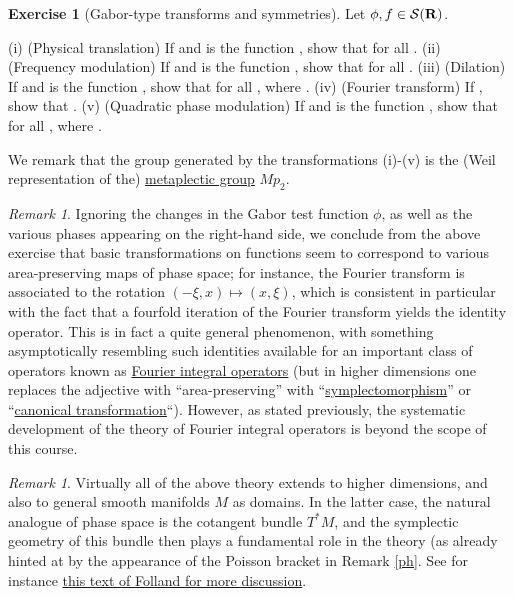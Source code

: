 \documentclass[11pt]{article}
\theoremstyle{definition}
\newtheorem{exercise}[theorem]{Exercise}
\theoremstyle{remark}
\newtheorem{remark}[theorem]{Remark}
\begin{document}
\begin{exercise}[Gabor-type transforms and symmetries]
  Let \({\phi, f \in {\mathcal S}({\bf R})}\). 


(i) (Physical translation) If  and  is the function , show that  for all . 
(ii) (Frequency modulation) If  and  is the function , show that  for all . 
(iii) (Dilation) If  and  is the function , show that  for all , where . 
(iv) (Fourier transform) If , show that . 
(v) (Quadratic phase modulation) If  and  is the function , show that  for all , where .


 We remark that the group generated by the transformations (i)-(v) is the (Weil representation of the) \href{https://en.wikipedia.org/wiki/Metaplectic_group}{metaplectic group} \({Mp_2}\). 

\end{exercise}
\begin{remark}
  Ignoring the changes in the Gabor test function \({\phi}\), as well as the various phases appearing on the right-hand side, we conclude from the above exercise that basic transformations on functions seem to correspond to various area-preserving maps of phase space; for instance, the Fourier transform is associated to the rotation \({(-\xi,x) \mapsto (x,\xi)}\), which is consistent in particular with the fact that a fourfold iteration of the Fourier transform yields the identity operator. This is in fact a quite general phenomenon, with something asymptotically resembling such identities available for an important class of operators known as \href{https://en.wikipedia.org/wiki/Fourier_integral_operator}{Fourier integral operators} (but in higher dimensions one replaces the adjective with “area-preserving” with “\href{https://en.wikipedia.org/wiki/Symplectomorphism}{symplectomorphism}” or “\href{https://en.wikipedia.org/wiki/Canonical_transformation}{canonical transformation}“). However, as stated previously, the systematic development of the theory of Fourier integral operators is beyond the scope of this course. 

\end{remark}
\begin{remark}
  Virtually all of the above theory extends to higher dimensions, and also to general smooth manifolds \({M}\) as domains. In the latter case, the natural analogue of phase space is the cotangent bundle \({T^* M}\), and the symplectic geometry of this bundle then plays a fundamental role in the theory (as already hinted at by the appearance of the Poisson bracket in Remark \ref{ph}. See for instance \href{https://mathscinet.ams.org/mathscinet-getitem?mr=983366}{this text of Folland for more discussion}. 

\end{remark}
 
\end{document}
